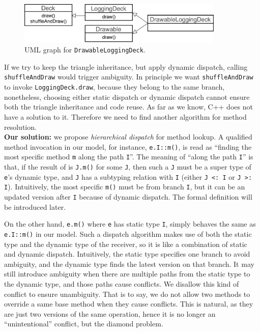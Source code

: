 \begin{figure}[t]
  \centering
  \includegraphics[height=2cm]{pics/DrawableLoggingDeck.pdf}
  \caption{UML graph for \lstinline|DrawableLoggingDeck|.}\label{fig:drawableloggingdeck}
\end{figure}
If we try to keep the triangle inheritance, but apply dynamic dispatch, calling \lstinline|shuffleAndDraw| would trigger ambiguity. 
In principle we want \lstinline|shuffleAndDraw| to invoke \lstinline|LoggingDeck.draw|, because they belong to the same branch, 
nonetheless, choosing either static dispatch
or dynamic dispatch cannot ensure both the triangle inheritance and code reuse. As far as we know, C++ does not have a solution
to it. Therefore we need to find another algorithm for method resolution.\\

\noindent\textbf{Our solution:} we propose \textit{hierarchical dispatch} for method lookup. A qualified
method invocation in our model, for instance, \lstinline|e.I::m()|, is read as
``finding the most specific method \lstinline|m| along the path
\lstinline|I|''. The meaning of ``along the path \lstinline|I|'' is
that, if the result of \dispatch{} is \lstinline|J.m()| for some \lstinline|J|, then such a \lstinline|J| must be a super type of \lstinline|e|'s dynamic type, and \lstinline|J| has a subtyping relation with \lstinline|I| (either \lstinline|J <: I| or \lstinline|J >: I|). Intuitively, the most specific \lstinline|m()| must be from branch \lstinline|I|, but it can be an updated version after \lstinline|I| because of dynamic dispatch. The formal definition will be introduced later.

On the other hand, \lstinline|e.m()| where \lstinline|e| has static type \lstinline|I|, simply behaves the same as \lstinline|e.I::m()| in our model. Such a dispatch algorithm makes use of both the static type and the dynamic type of the receiver, so it is like a combination of static and dynamic dispatch. Intuitively, the static type specifies one branch to avoid ambiguity, and the dynamic type finds the latest version on that branch. It may still introduce ambiguity when there are multiple paths from the static type to the dynamic type, and those paths cause conflicts. We disallow this kind of conflict to ensure unambiguity. That is to say, we do not allow two methods to override a same base method when they cause conflicts. This is natural, as they are just two versions of the same operation, hence it is no longer an ``unintentional'' conflict, but the diamond problem.

